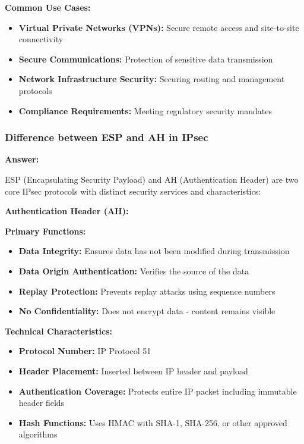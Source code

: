 \documentclass[12pt,a4paper]{article}
\begin{document}
\textbf{Common Use Cases:}
\begin{itemize}
    \item \textbf{Virtual Private Networks (VPNs):} Secure remote access and site-to-site connectivity
    \item \textbf{Secure Communications:} Protection of sensitive data transmission
    \item \textbf{Network Infrastructure Security:} Securing routing and management protocols
    \item \textbf{Compliance Requirements:} Meeting regulatory security mandates
\end{itemize}

\subsubsection{Difference between ESP and AH in IPsec}

\textbf{Answer:}

ESP (Encapsulating Security Payload) and AH (Authentication Header) are two core IPsec protocols with distinct security services and characteristics:

\textbf{Authentication Header (AH):}

\textbf{Primary Functions:}
\begin{itemize}
    \item \textbf{Data Integrity:} Ensures data has not been modified during transmission
    \item \textbf{Data Origin Authentication:} Verifies the source of the data
    \item \textbf{Replay Protection:} Prevents replay attacks using sequence numbers
    \item \textbf{No Confidentiality:} Does not encrypt data - content remains visible
\end{itemize}

\textbf{Technical Characteristics:}
\begin{itemize}
    \item \textbf{Protocol Number:} IP Protocol 51
    \item \textbf{Header Placement:} Inserted between IP header and payload
    \item \textbf{Authentication Coverage:} Protects entire IP packet including immutable header fields
    \item \textbf{Hash Functions:} Uses HMAC with SHA-1, SHA-256, or other approved algorithms
\end{itemize}
\end{document}
